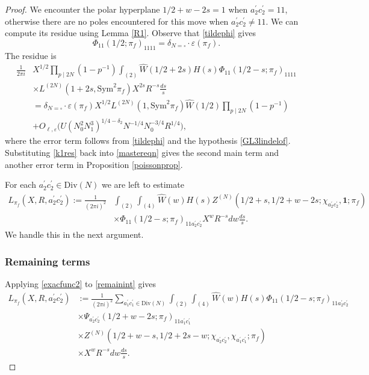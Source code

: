 \documentclass[12pt,reqno]{amsart}
\theoremstyle{plain}
\theoremstyle{remark}
\numberwithin{equation}{section}
\numberwithin{lemma}{section}
\numberwithin{theorem}{section}
\numberwithin{prop}{section}
\numberwithin{remark}{section}
\begin{document}
\begin{proof}
We encounter the polar hyperplane $1/2+w-2s=1$ when $a_2^{\prime} c_2^{\prime}=11$,
otherwise there are no poles encountered for this move when 
$a_2^{\prime} c_2^{\prime} \neq 11$. We can 
 compute its residue using Lemma \ref{R1}. 
Observe that \eqref{tildephi} gives 
\begin{equation*}
\Phi_{11}(1/2;\pi_{f})_{1111}=\delta_{N=\square} \cdot \varepsilon(\pi_f).
\end{equation*}
The residue is
\begin{align} \label{k1res}
\frac{1}{2 \pi i} & X^{1/2} \prod_{p \mid 2N} (1-p^{-1}) 
 \int_{(2)} \widehat{W}(1/2+2s) H(s) \Phi_{11}(1/2-s;\pi_f)_{1111} \nonumber \\
& \times L^{(2N)}(1+2s, \text{Sym}^2 \pi_f) X^{2s} R^{-s} \frac{ds}{s} \nonumber \\
&= \delta_{N=\square} \cdot \varepsilon(\pi_f) X^{1/2} L^{(2N)}(1,\text{Sym}^2 \pi_f) \widehat{W}(1/2) 
\prod_{p \mid 2N} (1-p^{-1}) \nonumber \\
&+O_{\ell,\varepsilon} \big( U (N_0^2 N_1^3)^{1/4-\delta_2} N^{-1/4} N_0^{-3/4} R^{1/4} \big),
\end{align}
where the error term follows from \eqref{tildephi} and the hypothesis \eqref{GL3lindelof}.
Substituting \eqref{k1res} back into \eqref{mastereqn} gives the 
second main term and another error term in Proposition \ref{poissonprop}. 

For each $a_2^{\prime} c_2^{\prime} \in \text{Div}(N)$ we are left to estimate 
\begin{align} \label{remainint}
L_{\pi_f}(X,R,a_2^{\prime} c_2^{\prime}):= \frac{1}{(2 \pi i)^2} & \int_{(2)}  \int_{(4)}  \widehat{W}(w) H(s)  
Z^{(N)} (1/2+s,1/2+w-2s;\chi_{a_2^{\prime} c_2^{\prime}},\mathbf{1};\pi_f) \nonumber \\
& \times \Phi_{11}(1/2-s;\pi_f)_{11a_2^{\prime} c_2^{\prime}}  X^{w} R^{-s} dw \frac{ds}{s}.
\end{align}
We handle this in the next argument.

\subsubsection{Remaining terms}
Applying \eqref{exacfunc2} to \eqref{remainint} gives
\begin{align} \label{Kpidevelop}  
L_{\pi_f}(X,R,a^{\prime}_2 c^{\prime}_2)&:=\frac{1}{(2 \pi i)^2} \sum_{a_1^{\prime} c_1^{\prime} \in \text{Div}(N)}
 \int_{(2)}  \int_{(4)} \widehat{W}(w) H(s)  \Phi_{11}(1/2-s;\pi_f)_{11a_2^{\prime} c_2^{\prime}} \nonumber \\ 
& \times \Psi_{a_2^{\prime} c_2^{\prime}}(1/2+w-2s;\pi_f)_{11 a_1^{\prime} c_1^{\prime}} \nonumber  \\
 & \times Z^{(N)} (1/2+w-s,1/2+2s-w;\chi_{a_2^{\prime} c_2^{\prime}} ,\chi_{a_1^{\prime} c_1^{\prime}};\pi_f)  \nonumber \\
& \times X^{w} R^{-s} dw \frac{ds}{s}.
\end{align}


\end{proof}
\end{document}
